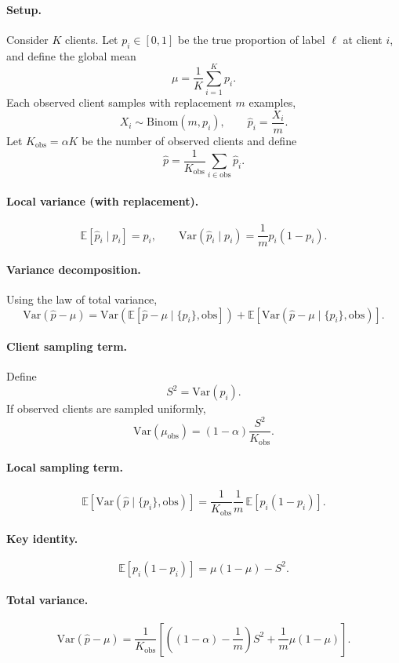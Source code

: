 \documentclass[runningheads]{llncs}
\begin{document}
\paragraph{Setup.}
Consider $K$ clients. Let $p_i \in [0,1]$ be the true proportion of label $\ell$
at client $i$, and define the global mean
\[
\mu = \frac{1}{K}\sum_{i=1}^K p_i .
\]
Each observed client samples with replacement $m$ examples,
\[
X_i \sim \mathrm{Binom}(m,p_i), 
\qquad 
\hat p_i = \frac{X_i}{m}.
\]
Let $K_{\text{obs}} = \alpha K$ be the number of observed clients and define
\[
\hat p = \frac{1}{K_{\text{obs}}}\sum_{i\in \mathrm{obs}} \hat p_i .
\]

\paragraph{Local variance (with replacement).}
\[
\mathbb{E}[\hat p_i \mid p_i] = p_i,
\qquad
\mathrm{Var}(\hat p_i \mid p_i) = \frac{1}{m} p_i(1-p_i).
\]

\paragraph{Variance decomposition.}
Using the law of total variance,
\[
\mathrm{Var}(\hat p-\mu)
=
\mathrm{Var}\!\left(\mathbb{E}[\hat p-\mu \mid \{p_i\},\mathrm{obs}]\right)
+
\mathbb{E}\!\left[\mathrm{Var}(\hat p-\mu \mid \{p_i\},\mathrm{obs})\right].
\]

\paragraph{Client sampling term.}
Define
\[
S^2 = \mathrm{Var}(p_i).
\]
If observed clients are sampled uniformly,
\[
\mathrm{Var}(\mu_{\mathrm{obs}}) 
= (1-\alpha)\frac{S^2}{K_{\mathrm{obs}}}.
\]

\paragraph{Local sampling term.}
\[
\mathbb{E}\!\left[\mathrm{Var}(\hat p \mid \{p_i\},\mathrm{obs})\right]
=
\frac{1}{K_{\mathrm{obs}}}\frac{1}{m}\,
\mathbb{E}[p_i(1-p_i)].
\]

\paragraph{Key identity.}
\[
\mathbb{E}[p_i(1-p_i)] 
= \mu(1-\mu) - S^2 .
\]

\paragraph{Total variance.}
\[
\mathrm{Var}(\hat p-\mu)
=
\frac{1}{K_{\mathrm{obs}}}
\left[
\left((1-\alpha)-\frac{1}{m}\right)S^2
+
\frac{1}{m}\mu(1-\mu)
\right].
\]
\end{document}
